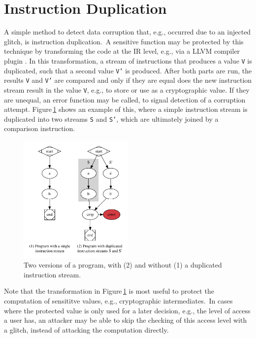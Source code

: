 \section{Instruction Duplication}
A simple method to detect data corruption that, e.g., occurred due to an injected glitch, is instruction duplication.\,\cite{chang2019evaluating} A sensitive function may be protected by this technique by transforming the code at the IR  level, e.g., via a LLVM compiler plugin . In this transformation, a stream of instructions that produces a value \texttt{V} is duplicated, such that a second value \texttt{V'} is produced. After both parts are run, the results \texttt{V} and \texttt{V'} are compared and only if they are equal does the new instruction stream result in the value \texttt{V}, e.g., to store or use as a cryptographic value. If they are unequal, an error function may be called, to signal detection of a corruption attempt. Figure\,\ref{fig:duplicated} shows an example of this, where a simple instruction stream is duplicated into two streams \texttt{S} and \texttt{S'}, which are ultimately joined by a comparison instruction.

\begin{figure}
	\centering
	\includegraphics[width=0.5\textwidth]{instruction_duplication}
	\caption{Two versions of a program, with (2) and without (1) a duplicated instruction stream.}
	\label{fig:duplicated}
\end{figure}

Note that the transformation in Figure\,\ref{fig:duplicated} is most useful to protect the computation of sensititve values, e.g., cryptographic intermediates.\,\cite{boneh1997importance} In cases where the protected value is only used for a later decision, e.g., the level of access a user has, an attacker may be able to skip the checking of this access level with a glitch, instead of attacking the computation directly. 



